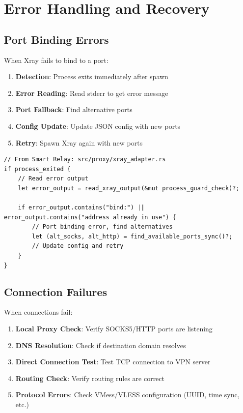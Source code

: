 \section{Error Handling and Recovery}

\subsection{Port Binding Errors}

When Xray fails to bind to a port:

\begin{enumerate}
    \item \textbf{Detection}: Process exits immediately after spawn
    \item \textbf{Error Reading}: Read stderr to get error message
    \item \textbf{Port Fallback}: Find alternative ports
    \item \textbf{Config Update}: Update JSON config with new ports
    \item \textbf{Retry}: Spawn Xray again with new ports
\end{enumerate}

\begin{verbatim}
// From Smart Relay: src/proxy/xray_adapter.rs
if process_exited {
    // Read error output
    let error_output = read_xray_output(&mut process_guard_check)?;
    
    if error_output.contains("bind:") || error_output.contains("address already in use") {
        // Port binding error, find alternatives
        let (alt_socks, alt_http) = find_available_ports_sync()?;
        // Update config and retry
    }
}
\end{verbatim}

\subsection{Connection Failures}

When connections fail:

\begin{enumerate}
    \item \textbf{Local Proxy Check}: Verify SOCKS5/HTTP ports are listening
    \item \textbf{DNS Resolution}: Check if destination domain resolves
    \item \textbf{Direct Connection Test}: Test TCP connection to VPN server
    \item \textbf{Routing Check}: Verify routing rules are correct
    \item \textbf{Protocol Errors}: Check VMess/VLESS configuration (UUID, time sync, etc.)
\end{enumerate}


